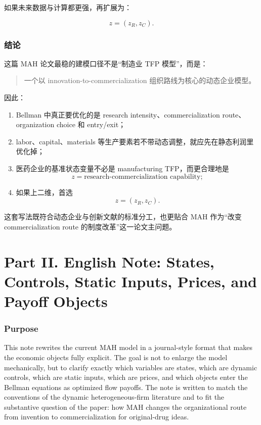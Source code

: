 \documentclass[12pt,fontset=none]{ctexart}
\begin{document}
如果未来数据与计算都更强，再扩展为：

\[
z=(z_R,z_C).
\]

\section{结论}

这篇 MAH 论文最稳的建模口径不是“制造业 TFP 模型”，而是：

\begin{quote}
一个以 innovation-to-commercialization 组织路线为核心的动态企业模型。
\end{quote}

因此：

\begin{enumerate}[leftmargin=2em]
    \item Bellman 中真正要优化的是 research intensity、commercialization route、organization choice 和 entry/exit；
    \item labor、capital、materials 等生产要素若不带动态调整，就应先在静态利润里优化掉；
    \item 医药企业的基准状态变量不必是 manufacturing TFP，而更合理地是
    \[
    z=\text{research-commercialization capability};
    \]
    \item 如果上二维，首选
    \[
    z=(z_R,z_C).
    \]
\end{enumerate}

这套写法既符合动态企业与创新文献的标准分工，也更贴合 MAH 作为“改变 commercialization route 的制度改革”这一论文主问题。


\newpage
\part*{Part II. English Note: States, Controls, Static Inputs, Prices, and Payoff Objects}


\section{Purpose}

This note rewrites the current MAH model in a journal-style format that makes the
economic objects fully explicit. The goal is not to enlarge the model mechanically,
but to clarify exactly which variables are states, which are dynamic controls, which
are static inputs, which are prices, and which objects enter the Bellman equations
as optimized flow payoffs. The note is written to match the conventions of the
dynamic heterogeneous-firm literature and to fit the substantive question of the
paper: how MAH changes the organizational route from invention to commercialization
for original-drug ideas.
\end{document}
